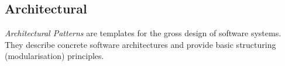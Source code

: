 %
%
%
%
%
%
%

\subsection{Architectural}
\label{architectural_heading}

\emph{Architectural Patterns} are templates for the gross design of software
systems. They describe concrete software architectures and provide basic
structuring (modularisation) principles.














